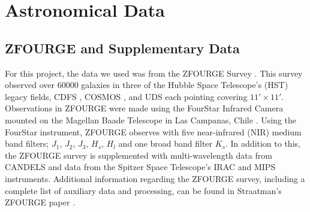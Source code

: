 \documentclass[11pt]{iopart}
\begin{document}
\section{Astronomical Data}
\subsection{ZFOURGE and Supplementary Data}
For this project, the data we used was from the ZFOURGE Survey \cite{straatman_fourstar_2016}. This survey observed over 60000 galaxies in three of the Hubble Space Telescope's (HST) legacy fields, CDFS \cite{giacconi_chandra_2002}, COSMOS \cite{scoville_cosmic_2007}, and UDS \cite{lawrence_ukirt_2007} each pointing covering $11' \times 11'$. Observations in ZFOURGE were made using the FourStar Infrared Camera mounted on the Magellan Baade Telescope in Las Campanas, Chile \cite{persson_fourstar_2013}. Using the FourStar instrument, ZFOURGE observes with five near-infrared (NIR) medium band filters; $J_1$, $J_2$, $J_3$, $H_s$, $H_l$ and one broad band filter $K_s$. In addition to this, the ZFOURGE survey is supplemented with multi-wavelength data from CANDELS \cite{grogin_candels_2011, koekemoer_candels_2011} and data from the Spitzer Space Telescope's IRAC \cite{fazio_infrared_2004} and MIPS \cite{rieke_multiband_2004} instruments. Additional information regarding the ZFOURGE survey, including a complete list of auxiliary data and processing, can be found in Straatman's ZFOURGE paper \cite{straatman_fourstar_2016}.
\end{document}
